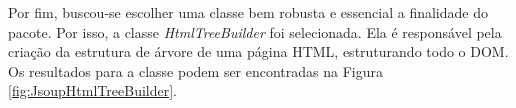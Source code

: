 

Por fim, buscou-se escolher uma classe bem robusta e essencial a finalidade do pacote. Por isso, a classe \textit{HtmlTreeBuilder} foi selecionada. Ela é responsável pela criação da estrutura de árvore de uma página HTML, estruturando todo o DOM. Os resultados para a classe podem ser encontradas na Figura \ref{fig:JsoupHtmlTreeBuilder}.

